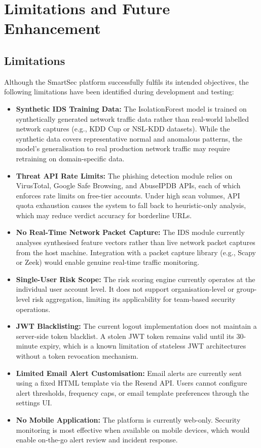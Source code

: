 \chapter{Limitations and Future Enhancement}

\section{Limitations}
Although the SmartSec platform successfully fulfils its intended objectives, the following limitations have been identified during development and testing:

\begin{itemize}
    \item \textbf{Synthetic IDS Training Data:} The IsolationForest model is trained on synthetically generated network traffic data rather than real-world labelled network captures (e.g., KDD Cup or NSL-KDD datasets). While the synthetic data covers representative normal and anomalous patterns, the model's generalisation to real production network traffic may require retraining on domain-specific data.

    \item \textbf{Threat API Rate Limits:} The phishing detection module relies on VirusTotal, Google Safe Browsing, and AbuseIPDB APIs, each of which enforces rate limits on free-tier accounts. Under high scan volumes, API quota exhaustion causes the system to fall back to heuristic-only analysis, which may reduce verdict accuracy for borderline URLs.

    \item \textbf{No Real-Time Network Packet Capture:} The IDS module currently analyses synthesised feature vectors rather than live network packet captures from the host machine. Integration with a packet capture library (e.g., Scapy or Zeek) would enable genuine real-time traffic monitoring.

    \item \textbf{Single-User Risk Scope:} The risk scoring engine currently operates at the individual user account level. It does not support organisation-level or group-level risk aggregation, limiting its applicability for team-based security operations.

    \item \textbf{JWT Blacklisting:} The current logout implementation does not maintain a server-side token blacklist. A stolen JWT token remains valid until its 30-minute expiry, which is a known limitation of stateless JWT architectures without a token revocation mechanism.

    \item \textbf{Limited Email Alert Customisation:} Email alerts are currently sent using a fixed HTML template via the Resend API. Users cannot configure alert thresholds, frequency caps, or email template preferences through the settings UI.

    \item \textbf{No Mobile Application:} The platform is currently web-only. Security monitoring is most effective when available on mobile devices, which would enable on-the-go alert review and incident response.
\end{itemize}

